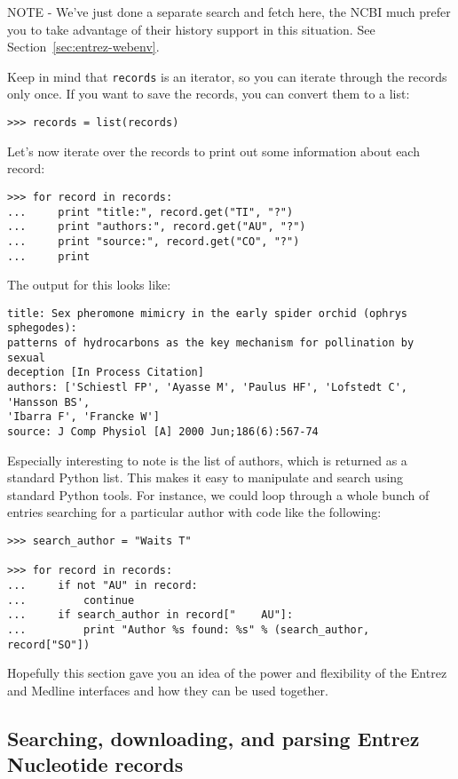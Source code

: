 \documentclass{report}
\begin{document}
NOTE - We've just done a separate search and fetch here, the NCBI much prefer you to take advantage of their history support in this situation.  See Section~\ref{sec:entrez-webenv}.

Keep in mind that \verb+records+ is an iterator, so you can iterate through the records only once. If you want to save the records, you can convert them to a list:
\begin{verbatim}
>>> records = list(records)
\end{verbatim}

Let's now iterate over the records to print out some information about each record:
\begin{verbatim}
>>> for record in records:
...     print "title:", record.get("TI", "?")
...     print "authors:", record.get("AU", "?")
...     print "source:", record.get("CO", "?")
...     print
\end{verbatim}

The output for this looks like:
\begin{verbatim}
title: Sex pheromone mimicry in the early spider orchid (ophrys sphegodes):
patterns of hydrocarbons as the key mechanism for pollination by sexual
deception [In Process Citation]
authors: ['Schiestl FP', 'Ayasse M', 'Paulus HF', 'Lofstedt C', 'Hansson BS',
'Ibarra F', 'Francke W']
source: J Comp Physiol [A] 2000 Jun;186(6):567-74
\end{verbatim}

Especially interesting to note is the list of authors, which is returned as a standard Python list. This makes it easy to manipulate and search using standard Python tools. For instance, we could loop through a whole bunch of entries searching for a particular author with code like the following:
\begin{verbatim}
>>> search_author = "Waits T"

>>> for record in records:
...     if not "AU" in record:
...         continue
...     if search_author in record["	AU"]:
...         print "Author %s found: %s" % (search_author, record["SO"])
\end{verbatim}

Hopefully this section gave you an idea of the power and flexibility of the Entrez and Medline interfaces and how they can be used together.

\subsection{Searching, downloading, and parsing Entrez Nucleotide records}
\label{subsec:entrez_example_genbank}
\end{document}
